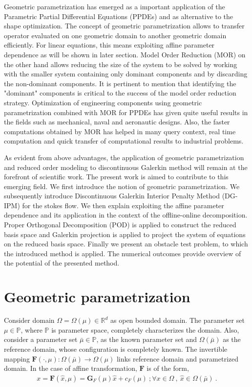 \documentclass[graybox]{svmult}
\begin{document}
Geometric parametrization has emerged as a important application of the Parametric Partial Differential Equations (PPDEs) and as alternative to the shape optimization. The concept of geometric parametrization allows to transfer operator evaluated on one geometric domain to another geometric domain efficiently. For linear equations, this means exploiting affine parameter dependence as will be shown in later section. Model Order Reduction (MOR) on the other hand allows reducing the size of the system to be solved by working with the smaller system containing only dominant components and by discarding the non-dominant components. It is pertinent to mention that identifying the "dominant" components is critical to the success of the model order reduction strategy. Optimization of engineering components using geometric parametrization combined with MOR for PPDEs has given quite useful results in the fields such as mechanical, naval and aeronautic designs. Also, the  faster computations obtained by MOR has helped in many query context, real time computation and quick transfer of computational results to industrial problems.

As evident from above advantages, the application of geometric parametrization and reduced order modeling to discontinuous Galerkin method will remain at the forefront of scientific work. The present work is aimed to contribute to this emerging field. We first introduce the notion of geometric parametrization. We subsequently introduce Discontinuous Galerkin Interior Penalty Method (DG-IPM) for the stokes flow. We then explain exploiting the affine parameter dependence and its application in the context of the offline-online decomposition. Proper Orthogonal Decomposition (POD) is applied to construct the reduced basis space and Galerkin projection is applied to project the system of equations on the reduced basis space. Finally we present an obstacle test problem, to which the introduced method is applied. The numerical outcomes provide overview of the potential of the presented method.

\section{Geometric parametrization}\label{geometric_parametrization_section}

Consider domain $\Omega = \Omega(\mu) \in \mathbb{R}^d$ as open bounded domain. The parameter set $\mu \in \mathbb{P}$, where $\mathbb{P}$ is parameter space, completely characterizes the domain. Also, consider a parameter set $\bar{\mu} \in \mathbb{P}$, as the known parameter set and $\Omega(\bar{\mu})$ as the reference domain, whose configuration is completely known. The invertible mapping $\bm{F}(\cdot,\mu) : \Omega(\bar{\mu}) \rightarrow \Omega(\mu)$ links reference domain and parametrized domain. In the case of affine transformation, $\bm{F}$ is of the form,
\begin{gather}\label{affine_F}
x = \bm{F}(\hat{x},\mu) = \bm{G}_F(\mu)\hat{x} + c_F(\mu) \ ; \forall x \in \Omega \ , \ \hat{x} \in \Omega(\bar{\mu}) \ .
\end{gather}
\end{document}
